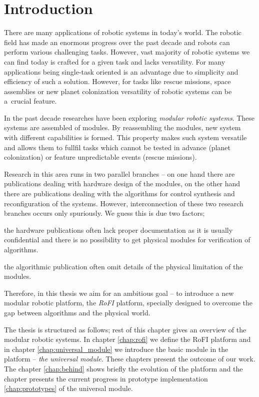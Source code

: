 \chapter{Introduction}\label{chap:introduction}

There are many applications of robotic systems in today's world. The robotic
field has made an enormous progress over the past decade and robots can perform
various challenging tasks. However, vast majority of robotic systems we can find
today is crafted for a given task and lacks versatility. For many applications
being single-task oriented is an advantage due to simplicity and efficiency of
such a solution. However, for tasks like rescue missions, space assemblies or
new planet colonization versatility of robotic systems can be a~crucial feature.

In the past decade researches have been exploring \emph{modular robotic
systems}. These systems are assembled of modules. By reassembling the modules,
new system with different capabilities is formed. This property makes such
system versatile and allows them to fullfil tasks which cannot be tested in
advance (planet colonization) or feature unpredictable events (rescue missions).

Research in this area runs in two parallel branches -- on one hand there are
publications dealing with hardware design of the modules, on the other hand
there are publications dealing with the algorithms for control synthesis and
reconfiguration of the systems. However, interconnection of these two research
branches occurs only spuriously. We guess this is due two factors;
\begin{enumerate*}
    \item the hardware publications often lack proper documentation as it is
    usually confidential and there is no possibility to get physical modules for
    verification of algorithms.
    \item the algorithmic publication often omit details of the physical
    limitation of the modules.
\end{enumerate*}

Therefore, in this thesis we aim for an ambitious goal -- to introduce a new
modular robotic platform, the \emph{RoFI} platform, specially designed to
overcome the gap between algorithms and the physical world. 

The thesis is structured as follows; rest of this chapter gives an overview of
the modular robotic systems. In chapter \ref{chap:rofi} we define the RoFI
platform and in chapter \ref{chap:universal_module} we introduce the basic
module in the platform -- \emph{the universal module}. These chapters present
the outcome of our work. The chapter \ref{chap:behind} shows briefly the
evolution of the platform and the chapter presents the current progress in
prototype implementation \ref{chap:prototypes} of the universal module.

